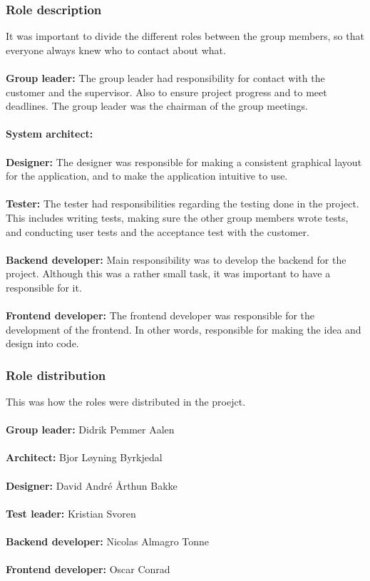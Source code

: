 \subsubsection{Role description}
It was important to divide the different roles between the group members, so that everyone always knew who to contact about what.\\
\\
\textbf{Group leader:} The group leader had responsibility for contact with the customer and the supervisor. Also to ensure project progress and to meet deadlines. The group leader was the chairman of the group meetings.\\
\\
\textbf{System architect:} \\
\\
\textbf{Designer:} The designer was responsible for making a consistent graphical layout for the application, and to make the application intuitive to use.\\
\\
\textbf{Tester:} The tester had responsibilities regarding the testing done in the project. This includes writing tests, making sure the other group members wrote tests, and conducting user tests and the acceptance test with the customer.\\
\\
\textbf{Backend developer:} Main responsibility was to develop the backend for the project. Although this was a rather small task, it was important to have a responsible for it.\\
\\
\textbf{Frontend developer:} The frontend developer was responsible for the development of the frontend. In other words, responsible for making the idea and design into code.

\subsubsection{Role distribution}
This was how the roles were distributed in the proejct.\\
\\
\textbf{Group leader:} Didrik Pemmer Aalen\\
\\
\textbf{Architect:} Bjor Løyning Byrkjedal \\
\\
\textbf{Designer:} David André Årthun Bakke\\
\\
\textbf{Test leader:} Kristian Svoren\\
\\
\textbf{Backend developer:} Nicolas Almagro Tonne\\
\\
\textbf{Frontend developer:} Oscar Conrad

